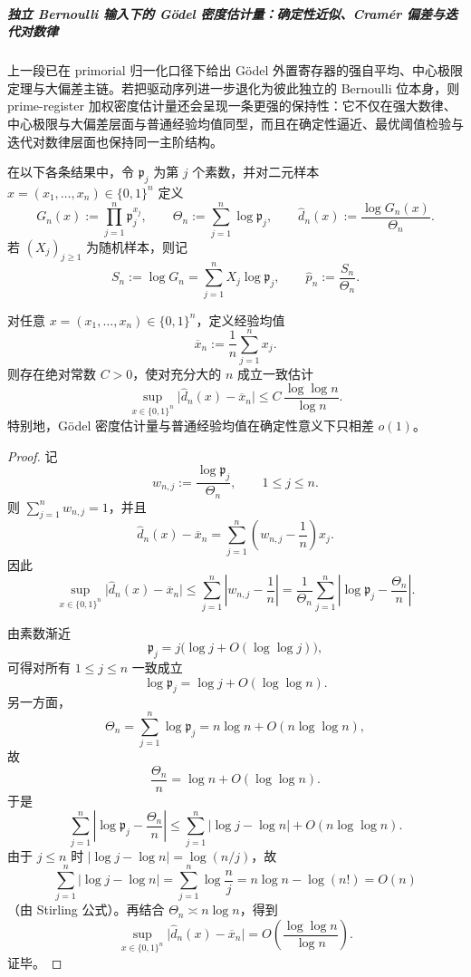 \subparagraph{独立 Bernoulli 输入下的 Gödel 密度估计量：确定性近似、Cramér 偏差与迭代对数律}
上一段已在 primorial 归一化口径下给出 Gödel 外置寄存器的强自平均、中心极限定理与大偏差主链。若把驱动序列进一步退化为彼此独立的 Bernoulli 位本身，则 prime-register 加权密度估计量还会呈现一条更强的保持性：它不仅在强大数律、中心极限与大偏差层面与普通经验均值同型，而且在确定性逼近、最优阈值检验与迭代对数律层面也保持同一主阶结构。

在以下各条结果中，令 \(\mathfrak p_j\) 为第 \(j\) 个素数，并对二元样本 \(x=(x_1,\dots,x_n)\in\{0,1\}^n\) 定义
\[
G_n(x):=\prod_{j=1}^{n}\mathfrak p_j^{x_j},
\qquad
\Theta_n:=\sum_{j=1}^{n}\log \mathfrak p_j,
\qquad
\widehat d_n(x):=\frac{\log G_n(x)}{\Theta_n}.
\]
若 \((X_j)_{j\ge 1}\) 为随机样本，则记
\[
S_n:=\log G_n=\sum_{j=1}^{n}X_j\log \mathfrak p_j,
\qquad
\widehat p_n:=\frac{S_n}{\Theta_n}.
\]

\begin{theorem}\label{thm:fold-godel-density-estimator-deterministic-mean-approx}
对任意 \(x=(x_1,\dots,x_n)\in\{0,1\}^n\)，定义经验均值
\[
\overline x_n:=\frac1n\sum_{j=1}^{n}x_j.
\]
则存在绝对常数 \(C>0\)，使对充分大的 \(n\) 成立一致估计
\[
\sup_{x\in\{0,1\}^n}\bigl|\widehat d_n(x)-\overline x_n\bigr|
\le
C\,\frac{\log\log n}{\log n}.
\]
特别地，Gödel 密度估计量与普通经验均值在确定性意义下只相差 \(o(1)\)。
\end{theorem}
\begin{proof}
记
\[
w_{n,j}:=\frac{\log \mathfrak p_j}{\Theta_n},
\qquad 1\le j\le n.
\]
则 \(\sum_{j=1}^{n}w_{n,j}=1\)，并且
\[
\widehat d_n(x)-\overline x_n
=
\sum_{j=1}^{n}\left(w_{n,j}-\frac1n\right)x_j.
\]
因此
\[
\sup_{x\in\{0,1\}^n}\bigl|\widehat d_n(x)-\overline x_n\bigr|
\le
\sum_{j=1}^{n}\left|w_{n,j}-\frac1n\right|
=
\frac{1}{\Theta_n}\sum_{j=1}^{n}\left|\log \mathfrak p_j-\frac{\Theta_n}{n}\right|.
\]

由素数渐近
\[
\mathfrak p_j=j\bigl(\log j+O(\log\log j)\bigr),
\]
可得对所有 \(1\le j\le n\) 一致成立
\[
\log \mathfrak p_j=\log j+O(\log\log n).
\]
另一方面，
\[
\Theta_n=\sum_{j=1}^{n}\log \mathfrak p_j
=
n\log n+O(n\log\log n),
\]
故
\[
\frac{\Theta_n}{n}=\log n+O(\log\log n).
\]
于是
\[
\sum_{j=1}^{n}\left|\log \mathfrak p_j-\frac{\Theta_n}{n}\right|
\le
\sum_{j=1}^{n}\bigl|\log j-\log n\bigr|+O(n\log\log n).
\]
由于 \(j\le n\) 时 \(|\log j-\log n|=\log(n/j)\)，故
\[
\sum_{j=1}^{n}\bigl|\log j-\log n\bigr|
=
\sum_{j=1}^{n}\log\frac{n}{j}
=
n\log n-\log(n!)
=
O(n)
\]
（由 Stirling 公式）。再结合 \(\Theta_n\asymp n\log n\)，得到
\[
\sup_{x\in\{0,1\}^n}\bigl|\widehat d_n(x)-\overline x_n\bigr|
=
O\!\left(\frac{\log\log n}{\log n}\right).
\]
证毕。
\end{proof}

